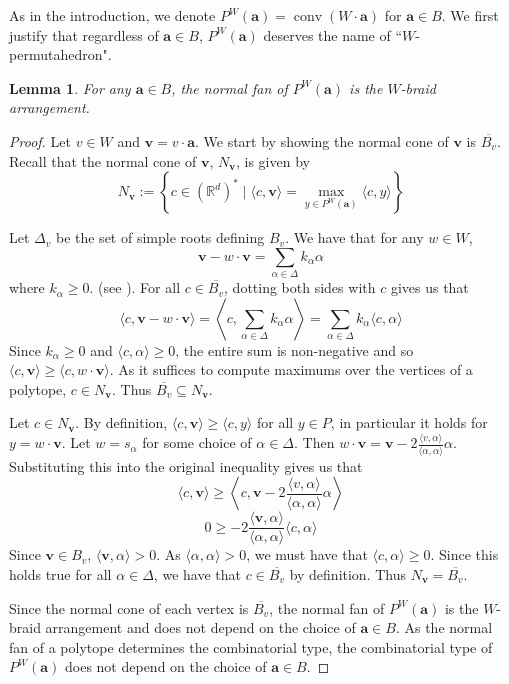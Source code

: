\documentclass{amsart}
\newtheorem{lem}[thm]{Lemma}
\theoremstyle{definition}
\newcommand{\bR}{\mathbb{R}}
\def\ba{\mathbf{a}}
\def\bv{\mathbf{v}}
\def\wperm_#1{P^W(#1)}
\DeclareMathOperator{\conv}{conv}
\begin{document}
As in the introduction, we denote $P^W(\ba)=\conv(W\cdot \ba)$ for $\ba\in B$. We first justify that regardless of $\ba \in B$, $P^W(\ba)$ deserves the name of ``$W$-permutahedron".
 
 \begin{lem}\label{lem:consistent-type}
    For any $\ba \in B$, the normal fan of $\wperm_\ba$ is the $W$-braid arrangement. 
\end{lem}

\begin{proof}
    Let $v \in W$ and $\bv = v \cdot \ba$. We start by showing the normal cone of $\bv$ is $\overline{B_v}$.
     Recall that the normal cone of $\bv$, $N_\bv$, is given by \[N_\bv:=\left\{c\in (\bR^d)^\ast\mid  \langle c,\bv\rangle = \underset{y\in \wperm_\ba}{\max} \langle c,y\rangle\right\}\] 
    
    Let $\Delta_v$ be the set of simple roots defining $B_v$. We have that for any $w\in W$, 
    \[\bv-w\cdot\bv=\underset{\alpha\in \Delta}{\sum}k_\alpha \alpha\]
    where $k_\alpha\geq 0$. (see \cite[Page 22]{Humphreys90}). For all $c\in \overline{B_v}$, dotting both sides with $c$ gives us that 
    \[\langle c,\bv-w\cdot\bv\rangle=\left\langle c,\underset{\alpha\in \Delta}{\sum}k_\alpha\alpha\right\rangle=\underset{\alpha\in\Delta}{\sum}k_\alpha \langle c,\alpha\rangle\] 
    Since $k_\alpha\geq 0$ and $\langle c,\alpha\rangle \geq0$, the entire sum is non-negative and so $\langle c,\bv\rangle \geq \langle c,w\cdot\bv\rangle$. As it suffices to compute maximums over the vertices of a polytope, $c\in N_\bv$. Thus $\overline{B_v}\subseteq N_\bv$.

    Let $c\in N_\bv$. By definition, $\langle c,\bv\rangle \geq \langle c,y\rangle $ for all $y\in P$, in particular it holds for $y=w\cdot \bv$. Let $w=s_\alpha$ for some choice of $\alpha\in \Delta$. Then $w\cdot \bv=\bv-2\frac{\langle v,\alpha\rangle}{\langle \alpha,\alpha\rangle}\alpha$. Substituting this into the original inequality gives us that 
    \[\langle c,\bv\rangle \geq \left\langle c,\bv-2\frac{\langle v,\alpha\rangle}{\langle \alpha,\alpha\rangle}\alpha\right\rangle\]
    \[0\geq -2\frac{\langle \bv,\alpha\rangle}{\langle \alpha,\alpha\rangle}\langle c,\alpha\rangle\]
    Since $\bv\in B_v$, $\langle \bv,\alpha\rangle >0$. As $\langle \alpha,\alpha\rangle >0$, we must have that $\langle c,\alpha\rangle \geq0$. Since this holds true for all $\alpha\in \Delta$, we have that $c\in \overline{B_v}$ by definition. Thus $N_\bv=\overline{B_v}$.

    Since the normal cone of each vertex is $\overline{B_v}$, the normal fan of $\wperm_\ba$ is the $W$-braid arrangement and does not depend on the choice of $\ba\in B$. As the normal fan of a polytope determines the combinatorial type, the combinatorial type of $\wperm_\ba$ does not depend on the choice of $\ba\in B$.
\end{proof}
 
\end{document}
